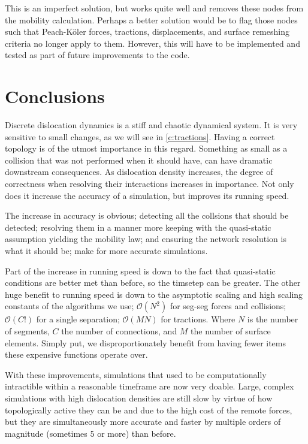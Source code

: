 This is an imperfect solution, but works quite well and removes these nodes from the mobility calculation. Perhaps a better solution would be to flag those nodes such that Peach-K\"{o}ler forces, tractions, displacements, and surface remeshing criteria no longer apply to them. However, this will have to be implemented and tested as part of future improvements to the code.

\section{Conclusions}

Discrete dislocation dynamics is a stiff and chaotic dynamical system. It is very sensitive to small changes, as we will see in \cref{c:tractions}. Having a correct topology is of the utmost importance in this regard. Something as small as a collision that was not performed when it should have, can have dramatic downstream consequences. As dislocation density increases, the degree of correctness when resolving their interactions increases in importance. Not only does it increase the accuracy of a simulation, but improves its running speed.

The increase in accuracy is obvious; detecting all the collsions that should be detected; resolving them in a manner more keeping with the quasi-static assumption yielding the mobility law; and ensuring the network resolution is what it should be; make for more accurate simulations.

Part of the increase in running speed is down to the fact that quasi-static conditions are better met than before, so the timsetep can be greater. The other huge benefit to running speed is down to the asymptotic scaling and high scaling constants of the algorithms we use; $\mathcal{O}(N^2)$ for seg-seg forces and collisions; $\mathcal{O}(C!)$ for a single separation; $\mathcal{O}(M N)$ for tractions. Where $N$ is the number of segments, $C$ the number of connections, and $M$ the number of surface elements. Simply put, we disproportionately benefit from having fewer items these expensive functions operate over.

With these improvements, simulations that used to be computationally intractible within a reasonable timeframe are now very doable. Large, complex simulations with high dislocation densities are still slow by virtue of how topologically active they can be and due to the high cost of the remote forces, but they are simultaneously more accurate and faster by multiple orders of magnitude (sometimes 5 or more) than before.
\savearabiccounter
